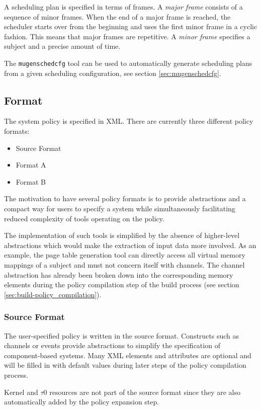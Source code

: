 \documentclass[a4paper,twoside,titlepage]{article}
\begin{document}
A scheduling plan is specified in terms of frames. A \emph{major frame} consists
of a sequence of minor frames. When the end of a major frame is reached, the
scheduler starts over from the beginning and uses the first minor frame in a
cyclic fashion. This means that major frames are repetitive. A
\emph{minor frame} specifies a subject and a precise amount of time.

The \texttt{mugenschedcfg} tool can be used to automatically generate
scheduling plans from a given scheduling configuration, see section
\ref{sec:mugenschedcfg}.

\subsection{Format}
The system policy is specified in XML. There are currently three different
policy formats:

\begin{itemize}
	\item Source Format
	\item Format A
	\item Format B
\end{itemize}

The motivation to have several policy formats is to provide abstractions and a
compact way for users to specify a system while simultaneously facilitating
reduced complexity of tools operating on the policy.

The implementation of such tools is simplified by the absence of higher-level
abstractions which would make the extraction of input data more involved. As
an example, the page table generation tool can directly access all virtual
memory mappings of a subject and must not concern itself with channels. The
channel abstraction has already been broken down into the corresponding memory
elements during the policy compilation step of the build process (see
section \ref{sec:build-policy_compilation}).

\subsubsection{Source Format}
The user-specified policy is written in the source format. Constructs such as
channels or events provide abstractions to simplify the specification of
component-based systems. Many XML elements and attributes are optional and will
be filled in with default values during later steps of the policy compilation
process.

Kernel and $\tau$0 resources are not part of the source format since they are also
automatically added by the policy expansion step.
\end{document}
